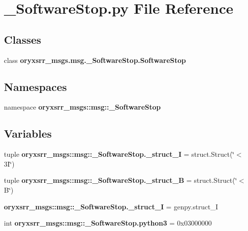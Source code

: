 \section{\-\_\-\-Software\-Stop.\-py \-File \-Reference}
\label{__SoftwareStop_8py}
\subsection*{\-Classes}
\begin{DoxyCompactItemize}
\item 
class {\bf oryxsrr\-\_\-msgs.\-msg.\-\_\-\-Software\-Stop.\-Software\-Stop}
\end{DoxyCompactItemize}
\subsection*{\-Namespaces}
\begin{DoxyCompactItemize}
\item 
namespace {\bf oryxsrr\-\_\-msgs\-::msg\-::\-\_\-\-Software\-Stop}
\end{DoxyCompactItemize}
\subsection*{\-Variables}
\begin{DoxyCompactItemize}
\item 
tuple {\bf oryxsrr\-\_\-msgs\-::msg\-::\-\_\-\-Software\-Stop.\-\_\-struct\-\_\-I} = struct.\-Struct(\char`\"{}$<$3\-I\char`\"{})
\item 
tuple {\bf oryxsrr\-\_\-msgs\-::msg\-::\-\_\-\-Software\-Stop.\-\_\-struct\-\_\-\-B} = struct.\-Struct(\char`\"{}$<$\-B\char`\"{})
\item 
{\bf oryxsrr\-\_\-msgs\-::msg\-::\-\_\-\-Software\-Stop.\-\_\-struct\-\_\-\-I} = genpy.\-struct\-\_\-\-I
\item 
int {\bf oryxsrr\-\_\-msgs\-::msg\-::\-\_\-\-Software\-Stop.\-python3} = 0x03000000
\end{DoxyCompactItemize}
